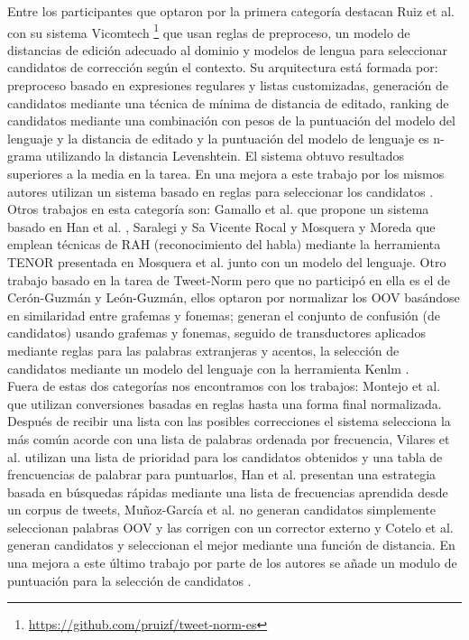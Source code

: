 \documentclass[spanish,12pt, a4paper,twoside]{paper}
\begin{document}
Entre los participantes que optaron por la primera categoría destacan Ruiz et al. \cite{ruizcuadros:2013} con su sistema Vicomtech \footnote{\url{https://github.com/pruizf/tweet-norm-es}} que usan reglas de preproceso, un modelo de distancias de edición adecuado al dominio y modelos de lengua para seleccionar candidatos de corrección según el contexto. Su arquitectura está formada por: preproceso basado en expresiones regulares y listas customizadas, generación de candidatos mediante una técnica de mínima de distancia de editado, ranking de candidatos mediante una combinación con pesos de la puntuación del modelo del lenguaje y la distancia de editado y la puntuación del modelo de lenguaje es n-grama utilizando la distancia Levenshtein. El sistema obtuvo resultados superiores a la media en la tarea. En una mejora a este trabajo por los mismos autores utilizan un sistema basado en reglas para seleccionar los candidatos \cite{ruizcuadros:2014}. Otros trabajos en esta categoría son: Gamallo et al. \cite{gamallo:2013} que propone un sistema basado en Han et al. \cite{han:2013}, Saralegi y Sa Vicente Rocal \cite{saralegi:2013} y Mosquera y Moreda\cite{mosqueralopezmoreda:2013} que emplean técnicas de RAH (reconocimiento del habla) mediante la herramienta TENOR presentada en Mosquera et al. \cite{mosquera:2012} junto con un modelo del lenguaje. Otro trabajo basado en la tarea de Tweet-Norm pero que no participó en ella es el de Cerón-Guzmán y León-Guzmán\cite{ceronguzman:2016}, ellos optaron por normalizar los OOV basándose en similaridad entre grafemas y fonemas; generan el conjunto de confusión (de candidatos) usando grafemas y fonemas, seguido de transductores aplicados mediante reglas para las palabras extranjeras y acentos, la selección de candidatos mediante un modelo del lenguaje con la herramienta Kenlm \cite{heafield:2011}.\\

Fuera de estas dos categorías nos encontramos con los trabajos: Montejo et al. \cite{montejo:2013} que utilizan conversiones basadas en reglas hasta una forma final normalizada. Después de recibir una lista con las posibles correcciones el sistema selecciona la más común acorde con una lista de palabras ordenada por frecuencia, Vilares et al. \cite{vilares:2013} utilizan una lista de prioridad para los candidatos obtenidos y una tabla de frencuencias de palabrar para puntuarlos, Han et al. \cite{han:2013} presentan una estrategia basada en búsquedas rápidas mediante una lista de frecuencias aprendida desde un corpus de tweets, Muñoz-García et al. \cite{munozgarcia:2013} no generan candidatos simplemente seleccionan palabras OOV y las corrigen con un corrector externo y Cotelo et al. \cite{cotelo:2013} generan candidatos y seleccionan el mejor mediante una función de distancia. En una mejora a este último trabajo por parte de los autores se añade un modulo de puntuación para la selección de candidatos \cite{cotelocruz:2015}. \\
\end{document}

